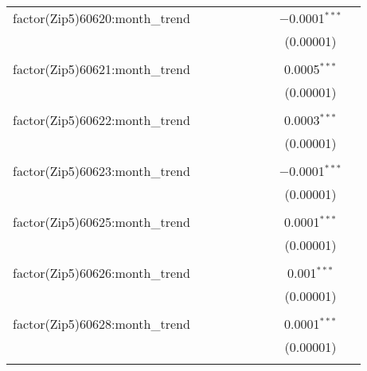 \begin{table}[H]
{\begin{tabular}{@{\extracolsep{5pt}}lcccccccc}
  factor(Zip5)60620:month\_trend &  &  &  &  &  &  & $-$0.0001$^{***}$ &  \\  

   &  &  &  &  &  &  & (0.00001) &  \\  

   & & & & & & & & \\  

  factor(Zip5)60621:month\_trend &  &  &  &  &  &  & 0.0005$^{***}$ &  \\  

   &  &  &  &  &  &  & (0.00001) &  \\  

   & & & & & & & & \\  

  factor(Zip5)60622:month\_trend &  &  &  &  &  &  & 0.0003$^{***}$ &  \\  

   &  &  &  &  &  &  & (0.00001) &  \\  

   & & & & & & & & \\  

  factor(Zip5)60623:month\_trend &  &  &  &  &  &  & $-$0.0001$^{***}$ &  \\  

   &  &  &  &  &  &  & (0.00001) &  \\  

   & & & & & & & & \\  

  factor(Zip5)60625:month\_trend &  &  &  &  &  &  & 0.0001$^{***}$ &  \\  

   &  &  &  &  &  &  & (0.00001) &  \\  

   & & & & & & & & \\  

  factor(Zip5)60626:month\_trend &  &  &  &  &  &  & 0.001$^{***}$ &  \\  

   &  &  &  &  &  &  & (0.00001) &  \\  

   & & & & & & & & \\  

  factor(Zip5)60628:month\_trend &  &  &  &  &  &  & 0.0001$^{***}$ &  \\  

   &  &  &  &  &  &  & (0.00001) &  \\  

   & & & & & & & & \\  


\end{tabular}}
\end{table}
